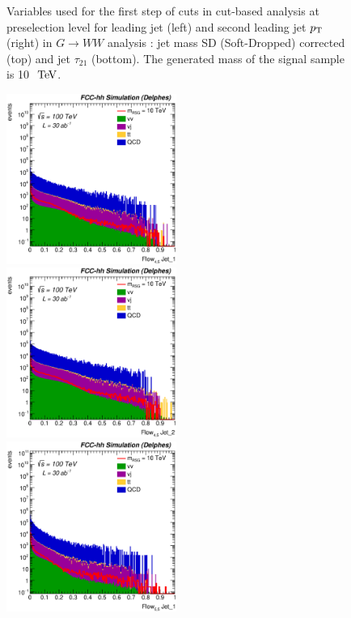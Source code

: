 \documentclass{cernrep}
\begin{document}
\begin{figure}[!htb]
\caption{Variables used for the first step of cuts in cut-based analysis at preselection level for leading jet (left) and second leading jet $p\sb{\scriptstyle\mathrm{T}}$ (right) in $G \rightarrow WW$ analysis : jet mass SD (Soft-Dropped) corrected (top) and jet $\tau_{21}$ (bottom). The generated mass of the signal sample is 10 $\TeV$.}
\label{fig:RSGww_sel0_cut}
\end{figure}

\begin{figure}[!htb]\centering
\includegraphics[width=0.495\textwidth]{Fig/RSGww/Jet1_Flow45_sel1_nostack_log.eps}
\includegraphics[width=0.495\textwidth]{Fig/RSGww/Jet2_Flow45_sel1_nostack_log.eps}
\includegraphics[width=0.495\textwidth]{Fig/RSGww/Jet1_Flow55_sel1_nostack_log.eps}

\end{figure}
\end{document}
